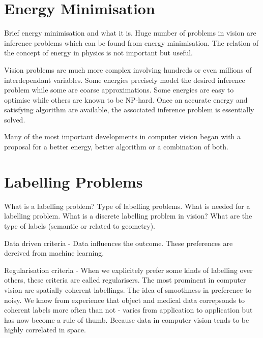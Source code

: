 
\section{Energy Minimisation}

Brief energy minimisation and what it is. Huge number of problems in vision are inference problems which can be found from energy minimisation. The relation of the concept of energy in physics is not important but useful.

Vision problems are much more complex involving hundreds or even millions of interdependant variables. Some energies precisely model the desired inference problem while some are coarse approximations. Some energies are easy to optimise while others are known to be NP-hard. Once an accurate energy and satisfying algorithm are available, the associated inference problem is essentially solved.

Many of the most important developments in computer vision began with a proposal for a better energy, better algorithm or a combination of both.


\section{Labelling Problems}

What is a labelling problem? Type of labelling problems. What is needed for a labelling problem. What is a discrete labelling problem in vision? What are the type of labels (semantic or related to geometry).

Data driven criteria - Data influences the outcome. These preferences are dereived from machine learning.

Regularisation criteria - When we explicitely prefer some kinds  of labelling over others, these criteria are called regularisers. The most prominent in computer vision are spatially coherent labellings. The idea of smoothness in preference to noisy. We know from experience that object and medical data correpsonds to coherent labels more often than not - varies from application to application but has now become a rule of thumb. Because data in computer vision tends to be highly correlated in space.


